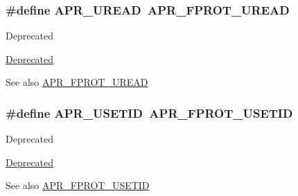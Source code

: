 \subsubsection[{\texorpdfstring{A\+P\+R\+\_\+\+U\+R\+E\+AD}{APR_UREAD}}]{\setlength{\rightskip}{0pt plus 5cm}\#define A\+P\+R\+\_\+\+U\+R\+E\+AD~{\bf A\+P\+R\+\_\+\+F\+P\+R\+O\+T\+\_\+\+U\+R\+E\+AD}}\hypertarget{group__apr__file__permissions_ga51dc87ecd94c98e97694e68d5d9620a0}{}\label{group__apr__file__permissions_ga51dc87ecd94c98e97694e68d5d9620a0}
\begin{DoxyRefDesc}{Deprecated}
\item[\hyperlink{deprecated__deprecated000004}{Deprecated}]\end{DoxyRefDesc}
\begin{DoxySeeAlso}{See also}
\hyperlink{group__apr__file__permissions_gaab6c4c2e7b95f4345c248c27b3f1a655}{A\+P\+R\+\_\+\+F\+P\+R\+O\+T\+\_\+\+U\+R\+E\+AD} 
\end{DoxySeeAlso}
\subsubsection[{\texorpdfstring{A\+P\+R\+\_\+\+U\+S\+E\+T\+ID}{APR_USETID}}]{\setlength{\rightskip}{0pt plus 5cm}\#define A\+P\+R\+\_\+\+U\+S\+E\+T\+ID~{\bf A\+P\+R\+\_\+\+F\+P\+R\+O\+T\+\_\+\+U\+S\+E\+T\+ID}}\hypertarget{group__apr__file__permissions_gafae6b531c08999345536cae5654d0d03}{}\label{group__apr__file__permissions_gafae6b531c08999345536cae5654d0d03}
\begin{DoxyRefDesc}{Deprecated}
\item[\hyperlink{deprecated__deprecated000003}{Deprecated}]\end{DoxyRefDesc}
\begin{DoxySeeAlso}{See also}
\hyperlink{group__apr__file__permissions_ga67caebf5bbe4f3f4b6252a75e5ce066f}{A\+P\+R\+\_\+\+F\+P\+R\+O\+T\+\_\+\+U\+S\+E\+T\+ID} 
\end{DoxySeeAlso}
